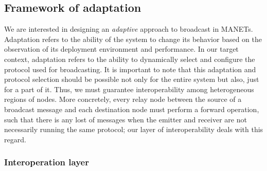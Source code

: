 \subsection{Framework of adaptation}
We are interested in designing an \emph{adaptive} approach to broadcast in MANETs.
%
Adaptation refers to the ability of the system to change its behavior based on the observation of its deployment environment and performance.
%
In our target context, adaptation refers to the ability to dynamically select and configure the protocol used for broadcasting.
%
It is important to note that this adaptation and protocol selection should be possible not only for the entire system but also, just for a part of it.
%
Thus, we must guarantee interoperability among heterogeneous regions of nodes.
%
More concretely, every relay node between the source of a broadcast message and each destination node must perform a forward operation, such that there is any lost of messages when the emitter and receiver are not necessarily running the same protocol; our layer of interoperability deals with this regard.

\subsubsection{Interoperation layer}


